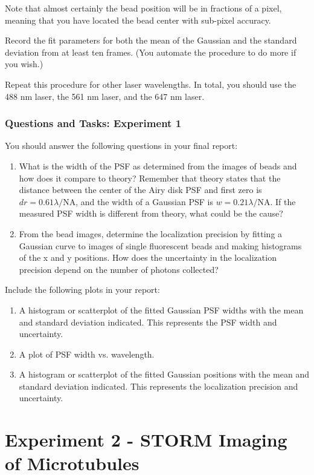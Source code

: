 \documentclass[10pt,a4paper,oneside]{book}
\begin{document}
Note that almost certainly the bead position will be in fractions of a pixel, meaning that you have located the bead center with sub-pixel accuracy.

Record the fit parameters for both the mean of the Gaussian and the standard deviation from at least ten frames. (You automate the procedure to do more if you wish.)

Repeat this procedure for other laser wavelengths. In total, you should use the 488 nm laser, the 561 nm laser, and the 647 nm laser.

\subsubsection{Questions and Tasks: Experiment 1}

You should answer the following questions in your final report:

\begin{enumerate}
    \item What is the width of the PSF as determined from the images of beads and how does it compare to theory? Remember that theory states that the distance between the center of the Airy disk PSF and first zero is $dr = 0.61 \lambda / \text{NA}$, and the width of a Gaussian PSF is $w = 0.21 \lambda / \text{NA}$. If the measured PSF width is different from theory, what could be the cause?
    \item From the bead images, determine the localization precision by fitting a Gaussian curve to images of single fluorescent beads and making histograms of the x and y positions. How does the uncertainty in the localization precision depend on the number of photons collected?
\end{enumerate}

Include the following plots in your report:

\begin{enumerate}
    \item A histogram or scatterplot of the fitted Gaussian PSF widths with the mean and standard deviation indicated. This represents the PSF width and uncertainty.
    \item A plot of PSF width vs. wavelength.
    \item A histogram or scatterplot of the fitted Gaussian positions with the mean and standard deviation indicated. This represents the localization precision and uncertainty.
\end{enumerate}

\section{Experiment 2 - STORM Imaging of Microtubules}\label{sec:exp2}
\end{document}
